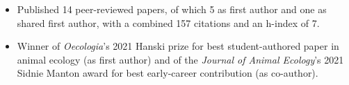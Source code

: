 


\begin{itemize}[noitemsep] 
  \item Published 14 peer-reviewed papers, of which 5 as first author and one as shared first author, with a combined 157 citations and an h-index of 7.
  \item Winner of \textit{Oecologia}'s 2021 Hanski prize for best student-authored paper in animal ecology (as first author) and of the \textit{Journal of Animal Ecology}'s 2021 Sidnie Manton award for best early-career contribution (as co-author).
\end{itemize}